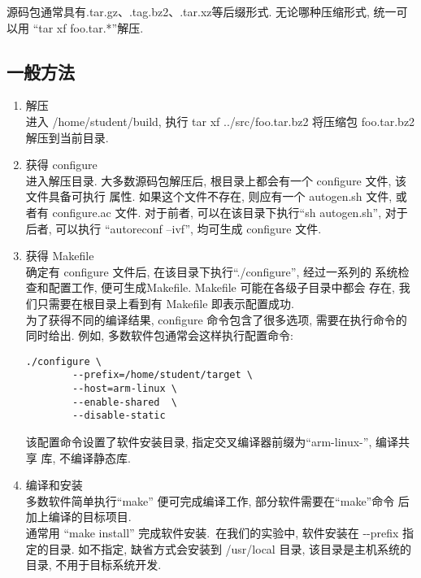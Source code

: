     源码包通常具有.tar.gz、.tag.bz2、.tar.xz等后缀形式. 无论哪种压缩形式,
统一可以用 ``tar xf foo.tar.*''解压.

\subsection{一般方法}
\begin{enumerate}
  \item 解压\\
      进入 /home/student/build, 执行 tar xf ../src/foo.tar.bz2 将压缩包
      foo.tar.bz2 解压到当前目录.
  \item 获得 configure\\
      进入解压目录.
      大多数源码包解压后, 根目录上都会有一个 configure 文件, 该文件具备可执行
      属性. 如果这个文件不存在, 则应有一个 autogen.sh 文件, 或者有
      configure.ac 文件. 对于前者, 可以在该目录下执行``sh autogen.sh'',
      对于后者, 可以执行 ``autoreconf --ivf'', 均可生成 configure 文件.
  \item 获得 Makefile\\
      确定有 configure 文件后, 在该目录下执行``./configure'', 经过一系列的
      系统检查和配置工作, 便可生成Makefile. Makefile 可能在各级子目录中都会
      存在, 我们只需要在根目录上看到有 Makefile 即表示配置成功.\\
      为了获得不同的编译结果, configure 命令包含了很多选项, 需要在执行命令的
      同时给出. 例如, 多数软件包通常会这样执行配置命令:

\lstset{extendedchars=false}
\lstset{numbers=none} 
\lstset{frameround=fttt}
         
\begin{lstlisting}[frame=trBL]
    ./configure \
        --prefix=/home/student/target \
        --host=arm-linux \
        --enable-shared  \
        --disable-static
\end{lstlisting}

    该配置命令设置了软件安装目录, 指定交叉编译器前缀为``arm-linux-'', 编译共享
库, 不编译静态库.

  \item 编译和安装\\
      多数软件简单执行``make'' 便可完成编译工作, 部分软件需要在``make''命令
      后加上编译的目标项目.\\
      通常用 ``make install'' 完成软件安装.~在我们的实验中, 软件安装在
      -{}-prefix 指定的目录. 如不指定, 缺省方式会安装到 /usr/local 目录, 
      该目录是主机系统的目录, 不用于目标系统开发.

\end{enumerate}

